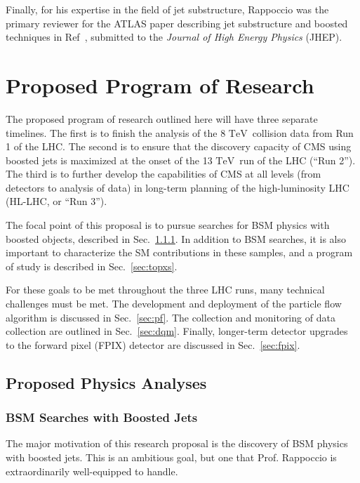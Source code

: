 \documentclass[12pt]{proposalnsf}
\newcommand{\TeV}{\ensuremath{\mathrm{TeV}}}
\begin{document}
Finally, for his expertise in the field of jet substructure, Rappoccio
was the primary reviewer for the ATLAS paper describing jet
substructure and boosted techniques in Ref~\cite{Aad:2013gja},
submitted to the {\em Journal of High Energy Physics} (JHEP). 

\section{Proposed Program of Research}

The proposed program of research outlined here will have three
separate timelines. The first is to finish the analysis of the 8
\TeV\ collision data from Run 1 of the LHC. The second is to ensure
that the discovery capacity of CMS using boosted jets is maximized at
the onset of the 13 \TeV\ run of the LHC (``Run 2''). The third is to
further develop the capabilities of CMS at all levels (from detectors
to analysis of data) in long-term planning of the high-luminosity LHC
(HL-LHC, or ``Run 3''). 

The focal point of this proposal is to pursue searches for BSM physics
with boosted objects, described in Sec.~\ref{sec:bsm}. In addition to
BSM searches, it is also important to characterize the SM
contributions in these samples, and a program of study is described in
Sec.~\ref{sec:topxs}. 

For these goals to be met throughout the three LHC runs, many
technical challenges must be met. The development and deployment of
the particle flow~\cite{particleflow} algorithm is discussed in
Sec.~\ref{sec:pf}. The collection and monitoring of data collection
are outlined in Sec.~\ref{sec:dqm}. Finally, longer-term detector
upgrades to the forward pixel (FPIX) detector are discussed in
Sec.~\ref{sec:fpix}. 


\subsection{Proposed Physics Analyses}
\label{sec:proposedanalyses}

\subsubsection{BSM Searches with Boosted Jets}
\label{sec:bsm}

The major motivation of this research proposal is the discovery of BSM
physics with boosted jets. This is an ambitious goal, but one that
Prof. Rappoccio is extraordinarily well-equipped to handle. 
\end{document}
